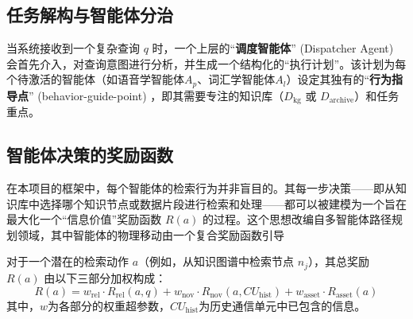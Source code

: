 \subsection{任务解构与智能体分治}
当系统接收到一个复杂查询 $q$ 时，一个上层的“\textbf{调度智能体}” (Dispatcher Agent) 会首先介入，对查询意图进行分析，并生成一个结构化的“执行计划”。该计划为每个待激活的智能体（如语音学智能体$A_p$、词汇学智能体$A_l$）设定其独有的“\textbf{行为指导点}” (behavior-guide-point) \cite{jiao2022multi}，即其需要专注的知识库（$D_{\text{kg}}$ 或 $D_{\text{archive}}$）和任务重点。

\subsection{智能体决策的奖励函数}
在本项目的框架中，每个智能体的检索行为并非盲目的。其每一步决策——即从知识库中选择哪个知识节点或数据片段进行检索和处理——都可以被建模为一个旨在最大化一个“信息价值”奖励函数 $R(a)$ 的过程。这个思想改编自多智能体路径规划领域，其中智能体的物理移动由一个复合奖励函数引导 

对于一个潜在的检索动作 $a$（例如，从知识图谱中检索节点 $n_j$），其总奖励 $R(a)$ 由以下三部分加权构成：
\begin{equation}
R(a) = w_{\text{rel}} \cdot R_{\text{rel}}(a, q) + w_{\text{nov}} \cdot R_{\text{nov}}(a, CU_{\text{hist}}) + w_{\text{asset}} \cdot R_{\text{asset}}(a)
\end{equation}
其中，$w$为各部分的权重超参数，$CU_{\text{hist}}$为历史通信单元中已包含的信息。

